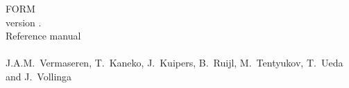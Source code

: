 \documentclass{report}
\begin{document}
\begin{center}
{\Huge FORM \\ \Large version \formmajorversion.\formminorversion
  \\ \huge Reference manual} \\

{\formdate} \\

{J.A.M.~Vermaseren, T.~Kaneko, J.~Kuipers, B.~Ruijl, M.~Tentyukov, T.~Ueda and J.~Vollinga}
\end{center}

\tableofcontents























\printindex
\end{document}
